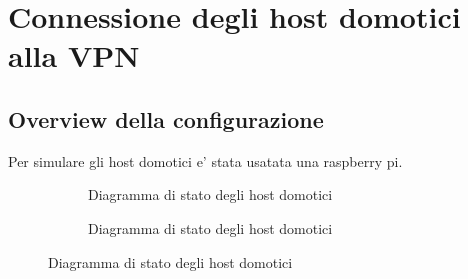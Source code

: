 
\chapter{Connessione degli host domotici alla VPN}

\section{Overview della configurazione}

Per simulare gli host domotici e' stata usatata una raspberry pi.

\begin{figure}[H]
    \centering
    \begin{subfigure}{0.44\linewidth}
        \centering
        \usebox{\myimage}
        \caption{Diagramma di stato degli host domotici}
        \label{fig:diag2-host}
    \end{subfigure}
    \hfill
    \begin{subfigure}{0.53\linewidth}
        \centering
        \caption{Diagramma di stato degli host domotici}
        \label{fig:diag2-host1}
    \end{subfigure}
\end{figure}


